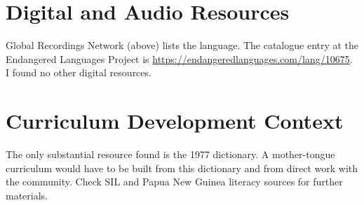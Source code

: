 \documentclass[12pt]{article}
\begin{document}
\section{Digital and Audio Resources}
Global Recordings Network (above) lists the language. The catalogue entry at the Endangered Languages Project is \url{https://endangeredlanguages.com/lang/10675}. I found no other digital resources.

\section{Curriculum Development Context}
The only substantial resource found is the 1977 dictionary. A mother-tongue curriculum would have to be built from this dictionary and from direct work with the community. Check SIL and Papua New Guinea literacy sources for further materials.
\end{document}
